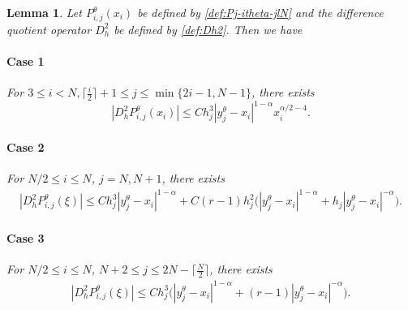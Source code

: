 \documentclass{amsart}
\newtheorem{lemma}[theorem]{Lemma}
\theoremstyle{definition}
\theoremstyle{remark}
\numberwithin{equation}{section}
\begin{document}
  \begin{lemma} \label{lmm:d2Pj-itle}
    Let \({P_{i,j}^\theta}(x_i)\) be defined by \eqref{def:Pj-itheta-jlN} and the difference quotient operator $D_h^2$ be defined by \eqref{def:Dh2}. Then we have
    \paragraph{Case 1}
    For \(3\le i < N, \lceil\frac{i}{2}\rceil+1 \le j \le \min\{2i-1, N-1\}\), there exists
    \begin{equation*}
      |D_h^2 {P_{i,j}^\theta}(x_{i})| \le C h_j^3 |y_j^\theta - x_i|^{1-\alpha} x_i^{\alpha/2-4}.
    \end{equation*}
    \paragraph{Case 2}
    For \(N/2\le i \le N\), \(j=N, N+1\), there exists
    \begin{equation*}
      \begin{aligned}
        |D_h^2 P_{i,j}^\theta(\xi)| 
        \le C h_j^3 |y_j^\theta - x_i|^{1-\alpha}  + C(r-1) h_j^2 \Big(|y_j^\theta - x_i|^{1-\alpha} + h_j|y_j^\theta - x_i|^{-\alpha}
        \Big).
      \end{aligned}
    \end{equation*}
    \paragraph{Case 3}
    For \(N/2 \le i \le N\), \(N+2 \le j \le 2N-\lceil\frac{N}{2}\rceil\), there exists
    \begin{equation*}
      \begin{aligned}
        |D_h^2 P_{i,j}^\theta(\xi)| 
        \le C h_j^3 \Big(|y_j^\theta - x_i|^{1-\alpha}  + (r-1) |y_j^\theta - x_i|^{-\alpha}
        \Big).
      \end{aligned}
    \end{equation*}
  \end{lemma}
\end{document}
